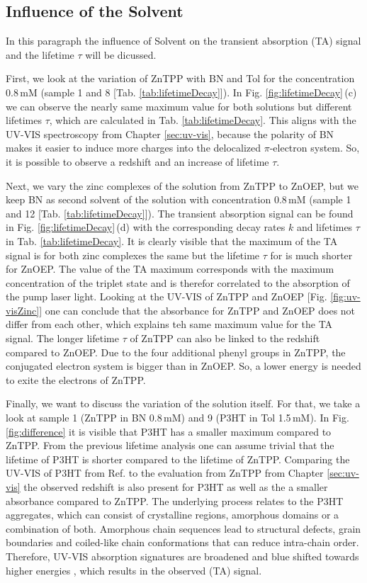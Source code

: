 \subsection{Influence of the Solvent}
\label{sub:difference}

In this paragraph the influence of Solvent on the transient absorption (TA) signal and the lifetime $\tau$ will be dicussed. 
\bigskip

First, we look at the variation of ZnTPP with BN and Tol for the concentration 0.8\,mM (sample 1 and 8 [Tab. \ref{tab:lifetimeDecay}]). In Fig. \ref{fig:lifetimeDecay}\,(c) we can observe the nearly same maximum value for both solutions but different lifetimes $\tau$, which are calculated in Tab. \ref{tab:lifetimeDecay}. This aligns with the UV-VIS spectroscopy from Chapter \ref{sec:uv-vis}, because the polarity of BN makes it easier to induce more charges into the delocalized $\pi$-electron system. So, it is possible to observe a redshift and an increase of lifetime $\tau$. 
\bigskip

Next, we vary the zinc complexes of the solution from ZnTPP to ZnOEP, but we keep BN as second solvent of the solution with concentration 0.8\,mM (sample 1 and 12 [Tab. \ref{tab:lifetimeDecay}]). The transient absorption signal can be found in Fig. \ref{fig:lifetimeDecay}\,(d) with the corresponding decay rates $k$ and lifetimes $\tau $ in Tab. \ref{tab:lifetimeDecay}. It is clearly visible that the maximum of the TA signal is for both zinc complexes the same but the lifetime $\tau$ for is much shorter for ZnOEP. The value of the TA maximum corresponds with the maximum concentration of the triplet state and is therefor correlated to the absorption of the pump laser light. Looking at the UV-VIS of ZnTPP and ZnOEP [Fig. \ref{fig:uv-visZinc}] one can conclude that the absorbance for ZnTPP and ZnOEP does not differ from each other, which explains teh same maximum value for the TA signal. The longer lifetime $\tau$ of ZnTPP can also be linked to the redshift compared to ZnOEP. Due to the four additional phenyl groups in ZnTPP, the conjugated electron system is bigger than in ZnOEP. So, a lower energy is needed to exite the electrons of ZnTPP.
\bigskip

Finally, we want to discuss the variation of the solution itself. For that, we take a look at sample 1 (ZnTPP in BN 0.8\,mM) and 9 (P3HT in Tol 1.5\,mM). In Fig. \ref{fig:difference} it is visible that P3HT has a smaller maximum compared to ZnTPP. From the previous lifetime analysis one can assume trivial that the lifetime of P3HT is shorter compared to the lifetime of ZnTPP. Comparing the UV-VIS of P3HT from Ref.  to the evaluation from ZnTPP from Chapter \ref{sec:uv-vis} the observed redshift is also present for P3HT as well as the a smaller absorbance compared to ZnTPP. The underlying process relates to the P3HT aggregates, which can consist of crystalline regions, amorphous domains or a combination of both. Amorphous chain sequences lead to structural defects, grain boundaries and coiled-like chain conformations that can reduce intra-chain order. Therefore, UV-VIS absorption signatures are broadened and blue shifted towards higher energies \cite{Rahimi2014}, which results in the observed (TA) signal.

